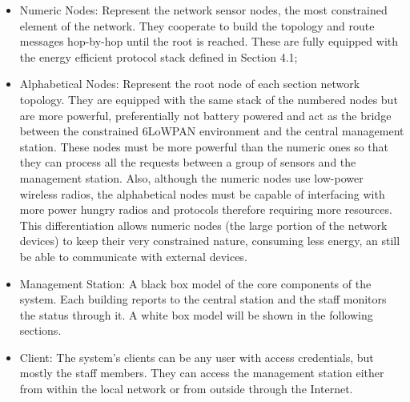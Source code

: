 \begin{itemize}
	\item Numeric Nodes: Represent the network sensor nodes, the most constrained element of the network. They cooperate to build the topology and route messages hop-by-hop until the root is reached. These are fully equipped with the energy efficient protocol stack defined in Section 4.1;\\
	\item Alphabetical Nodes: Represent the root node of each section network topology. They are equipped with the same stack of the numbered nodes but are more powerful, preferentially not battery powered and act as the bridge between the constrained 6LoWPAN environment and the central management station. These nodes must be more powerful than the numeric ones so that they can process all the requests between a group of sensors and the management station. Also, although the numeric nodes use low-power wireless radios, the alphabetical nodes must be capable of interfacing with more power hungry radios and protocols therefore requiring more resources. This differentiation allows numeric nodes (the large portion of the network devices) to keep their very constrained nature, consuming less energy, an still be able to communicate with external devices.\\
	\item Management Station: A black box model of the core components of the system. Each building reports to the central station and the staff monitors the status through it. A white box model will be shown in the following sections.\\
	\item Client: The system's clients can be any user with access credentials, but mostly the staff members. They can access the management station either from within the local network or from outside through the Internet.
\end{itemize}

\vspace{25mm} %
 
